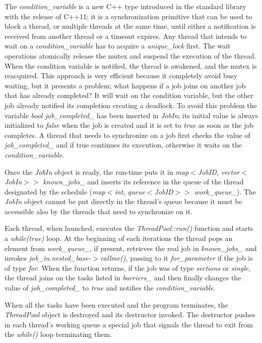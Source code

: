 \documentclass[a4paper,11pt,oneside]{book}
\begin{document}
The \emph{condition\_variable} is a new C++ type introduced in the standard library with the release of C++11; it is a synchronization primitive that can be used to block a thread, or multiple threads at the same time, until either a notification is received from another thread or a timeout expires. Any thread that intends to wait on a \emph{condition\_variable} has to acquire a \emph{unique\_lock} first. The wait operations atomically release the mutex and suspend the execution of the thread. When the condition variable is notified, the thread is awakened, and the mutex is reacquired. This approach is very efficient because it completely avoid busy waiting, but it presents a problem; what happens if a job joins on another job that has already completed? It will wait on the condition variable, but the other job already notified its completion creating a deadlock. To avoid this problem the variable \emph{bool job\_completed\_} has been inserted in \emph{JobIn}; its initial value is always initialized to \emph{false} when the job is created and it is set to \emph{true} as soon as the job completes. A thread that needs to synchronize on a job first checks the value of \emph{job\_completed\_} and if true continues its execution, otherwise it waits on the \emph{condition\_variable}.

Once the \emph{JobIn} object is ready, the run-time puts it in \emph{map$<$JobID, vector$<$JobIn$>>$ known\_jobs\_} and inserts its reference in the queue of the thread designated by the schedule (\emph{map$<$int, queue$<$JobID$>>$ work\_queue\_}). The \emph{JobIn} object cannot be put directly in the thread’s queue because it must be accessible also by the threads that need to synchronize on it. 

Each thread, when launched, executes the \emph{ThreadPool::run()} function and starts a \emph{while(true)} loop. At the beginning of each iterations the thread pops an element from \emph{work\_queue\_}, if present, retrieves the real job in \emph{known\_jobs\_} and invokes \emph{job\_in.nested\_base-$>$callme()}, passing to it \emph{for\_parameter} if the job is of type \emph{for}. When the function returns, if the job was of type \emph{sections} or \emph{single}, the thread joins on the tasks listed in \emph{barriers\_} and then finally changes the value of \emph{job\_completed\_} to \emph{true} and notifies the \emph{condition\_variable}.

When all the tasks have been executed and the program terminates, the \emph{ThreadPool} object is destroyed and its destructor invoked. The destructor pushes in each thread’s working queue a special job that signals the thread to exit from the \emph{while()} loop terminating them.
\end{document}
